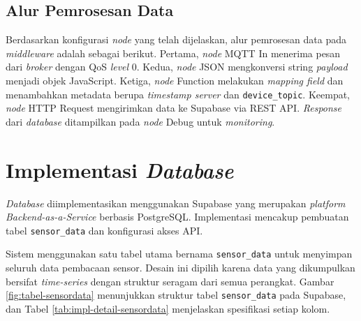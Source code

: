 \subsection{Alur Pemrosesan Data}

Berdasarkan konfigurasi \textit{node} yang telah dijelaskan, alur pemrosesan data pada \textit{middleware} adalah sebagai berikut. Pertama, \textit{node} MQTT In menerima pesan dari \textit{broker} dengan QoS \textit{level} 0. Kedua, \textit{node} JSON mengkonversi string \textit{payload} menjadi objek JavaScript. Ketiga, \textit{node} Function melakukan \textit{mapping field} dan menambahkan metadata berupa \textit{timestamp server} dan \texttt{device\_topic}. Keempat, \textit{node} HTTP Request mengirimkan data ke Supabase via REST API. \textit{Response} dari \textit{database} ditampilkan pada \textit{node} Debug untuk \textit{monitoring}.

\section{Implementasi \textit{Database}}
\label{sec:impl-database}

\textit{Database} diimplementasikan menggunakan Supabase yang merupakan \textit{platform Backend-as-a-Service} berbasis PostgreSQL. Implementasi mencakup pembuatan tabel \texttt{sensor\_data} dan konfigurasi akses API.

Sistem menggunakan satu tabel utama bernama \texttt{sensor\_data} untuk menyimpan seluruh data pembacaan sensor. Desain ini dipilih karena data yang dikumpulkan bersifat \textit{time-series} dengan struktur seragam dari semua perangkat. Gambar \ref{fig:tabel-sensordata} menunjukkan struktur tabel \texttt{sensor\_data} pada Supabase, dan Tabel \ref{tab:impl-detail-sensordata} menjelaskan spesifikasi setiap kolom.


